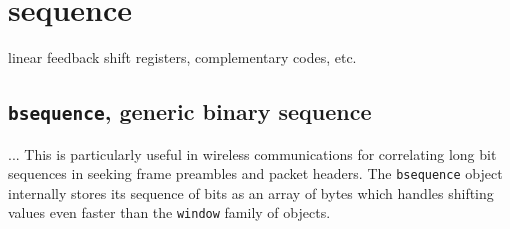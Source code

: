 % 
%

\newpage
\section{sequence}
\label{module:sequence}
linear feedback shift registers, complementary codes, etc.

\subsection{{\tt bsequence}, generic binary sequence}
\label{module:sequence:bsequence}
...
This is particularly useful in wireless communications for correlating long
bit sequences in seeking frame preambles and packet headers.
The {\tt bsequence} object internally stores its sequence of bits as an array
of bytes which handles shifting values even faster than the {\tt window}
family of objects.


